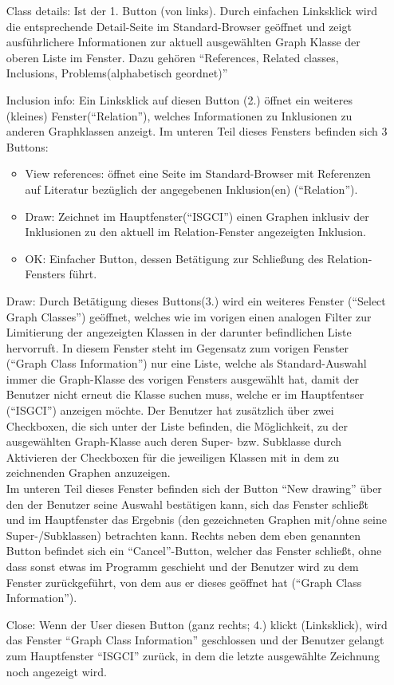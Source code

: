 \documentclass[10pt,a4paper]{article}
\begin{document}
\begin{itemize}
\item[Class details:] Ist der 1. Button (von links). Durch einfachen Linksklick wird die entsprechende Detail-Seite im Standard-Browser geöffnet und zeigt ausführlichere Informationen zur aktuell ausgewählten Graph Klasse der oberen Liste im Fenster. Dazu gehören "`References, Related classes, Inclusions, Problems(alphabetisch geordnet)"'
\item[Inclusion info:] Ein Linksklick auf diesen Button (2.) öffnet ein weiteres (kleines) Fenster("`Relation"'), welches Informationen zu Inklusionen zu anderen Graphklassen anzeigt. Im unteren Teil dieses Fensters befinden sich 3 Buttons:
\begin{itemize}
\item View references: öffnet eine Seite im Standard-Browser mit Referenzen auf Literatur bezüglich der angegebenen Inklusion(en) ("`Relation"').
\item Draw: Zeichnet im Hauptfenster("`ISGCI"') einen Graphen inklusiv der Inklusionen zu den aktuell im Relation-Fenster angezeigten Inklusion.
\item OK: Einfacher Button, dessen Betätigung zur Schließung des Relation-Fensters führt.
\end{itemize}
\item[Draw:] Durch Betätigung dieses Buttons(3.) wird ein weiteres Fenster ("`Select Graph Classes"') geöffnet, welches wie im vorigen einen analogen Filter zur Limitierung der angezeigten Klassen in der darunter befindlichen Liste hervorruft. In diesem Fenster steht im Gegensatz zum vorigen Fenster ("`Graph Class Information"') nur eine Liste, welche als Standard-Auswahl immer die Graph-Klasse des vorigen Fensters ausgewählt hat, damit der Benutzer nicht erneut die Klasse suchen muss, welche er im Hauptfentser ("`ISGCI"') anzeigen möchte. Der Benutzer hat zusätzlich über zwei Checkboxen, die sich unter der Liste befinden, die Möglichkeit, zu der ausgewählten Graph-Klasse auch deren Super- bzw. Subklasse durch Aktivieren der Checkboxen für die jeweiligen Klassen mit in dem zu zeichnenden Graphen anzuzeigen. \\ Im unteren Teil dieses Fenster befinden sich der Button "`New drawing"' über den der Benutzer seine Auswahl bestätigen kann, sich das Fenster schließt und im Hauptfenster das Ergebnis (den gezeichneten Graphen mit/ohne seine Super-/Subklassen) betrachten kann. Rechts neben dem eben genannten Button befindet sich ein "`Cancel"'-Button, welcher das Fenster schließt, ohne dass sonst etwas im Programm geschieht und der Benutzer wird zu dem Fenster zurückgeführt, von dem aus er dieses geöffnet hat ("`Graph Class Information"').
\item[Close:] Wenn der User diesen Button (ganz rechts; 4.) klickt (Linksklick), wird das Fenster "`Graph Class Information"' geschlossen und der Benutzer gelangt zum Hauptfenster "`ISGCI"' zurück, in dem die letzte ausgewählte Zeichnung noch angezeigt wird.
\end{itemize}
\end{document}
